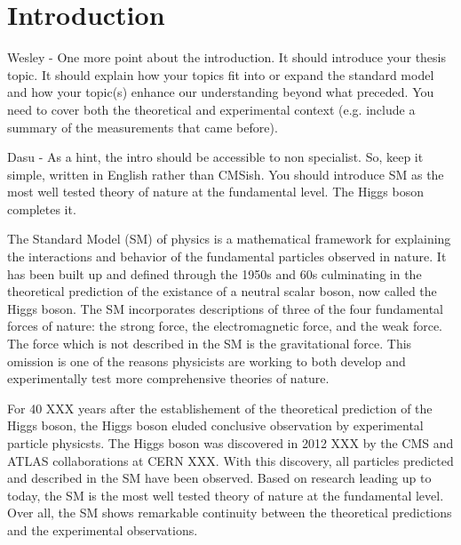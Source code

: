 \chapter{Introduction}
\label{sec:introduction}

Wesley -
One more point about the introduction. It should introduce your thesis topic.
It should explain how your topics fit into or expand the standard model and
how your topic(s) enhance our understanding beyond what preceded. You
need to cover both the theoretical and experimental context (e.g. include
a summary of the measurements that came before).

Dasu - 
As a hint, the intro should be accessible to non specialist. So, keep it simple, written in English rather than CMSish. You should introduce SM as the most well tested theory of nature at the fundamental level. The Higgs boson completes it.



The Standard Model (SM) of physics is a mathematical framework for explaining
the interactions and behavior of the fundamental particles observed in nature.
It has been built up and defined through the 1950s and 60s culminating in the
theoretical prediction of the existance of a neutral scalar boson, now called the
Higgs boson.
The SM incorporates descriptions of three of the four fundamental forces of nature:
the strong force, the electromagnetic force, and the weak force.
The force which is not described in the SM is the gravitational force. This omission is one of the reasons
physicists are working to both develop and experimentally test more comprehensive 
theories of nature.

For 40 XXX years after the establishement of the
theoretical prediction of the Higgs boson, the Higgs boson eluded conclusive
observation by experimental particle physicsts. The Higgs boson was discovered in 2012 XXX
by the CMS and ATLAS collaborations at CERN XXX.
With this discovery, all particles predicted and described in the SM have been observed.
Based on research leading up to today, the SM is the most well tested theory of nature at the fundamental level.
Over all, the SM shows remarkable continuity between the theoretical predictions and
the experimental observations. 

